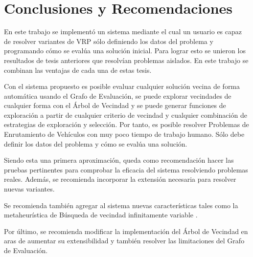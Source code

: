 \chapter*{Conclusiones y Recomendaciones}\label{chapter:conclusions}
En este trabajo se implementó un sistema mediante el cual un usuario es capaz de resolver variantes de VRP sólo definiendo los datos del problema y programando cómo se evalúa una solución inicial. Para lograr esto se unieron los resultados de tesis anteriores \cite{Hector, JJ, Heidy} que resolvían problemas aislados. En este trabajo se combinan las ventajas de cada una de estas tesis.

Con el sistema propuesto es posible evaluar cualquier solución vecina de forma automática usando el Grafo de Evaluación, se puede explorar vecindades de cualquier forma con el Árbol de Vecindad y se puede generar funciones de exploración a partir de cualquier criterio de vecindad y cualquier combinación de estrategias de exploración y selección. Por tanto, es posible resolver Problemas de Enrutamiento de Vehículos con muy poco tiempo de trabajo humano. Sólo debe definir los datos del problema y cómo se evalúa una solución.

Siendo esta una primera aproximación, queda como recomendación hacer las pruebas pertinentes para comprobar la eficacia del sistema resolviendo problemas reales. Además, se recomienda incorporar la extensión necesaria para resolver nuevas variantes.

Se recomienda también agregar al sistema nuevas características tales como la metaheurística de Búsqueda de vecindad infinitamente variable \cite{Camila}.

Por último, se recomienda modificar la implementación del Árbol de Vecindad en aras de aumentar su extensibilidad y también resolver las limitaciones del Grafo de Evaluación.


